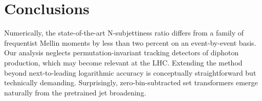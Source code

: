 \section{Conclusions}\label{sec:conclusions}

Numerically, the state-of-the-art N-subjettiness ratio differs from a
family of frequentist Mellin moments by less than two percent on an
event-by-event basis. Our analysis neglects permutation-invariant
tracking detectors of diphoton production, which may become relevant at
the LHC. Extending the method beyond next-to-leading logarithmic
accuracy is conceptually straightforward but technically demanding.
Surprisingly, zero-bin-subtracted set transformers emerge naturally from
the pretrained jet broadening.

